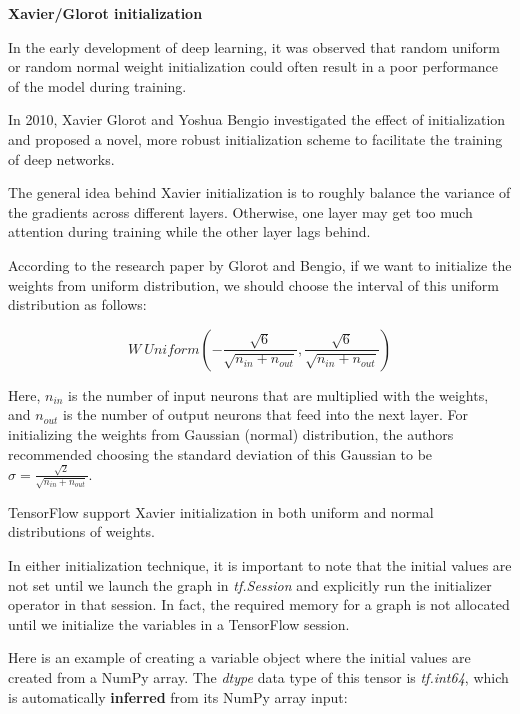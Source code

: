 \documentclass[11pt]{article}
\begin{document}
    \textbf{Xavier/Glorot initialization}

In the early development of deep learning, it was observed that random
uniform or random normal weight initialization could often result in a
poor performance of the model during training.

In 2010, Xavier Glorot and Yoshua Bengio investigated the effect of
initialization and proposed a novel, more robust initialization scheme
to facilitate the training of deep networks.

The general idea behind Xavier initialization is to roughly balance the
variance of the gradients across different layers. Otherwise, one layer
may get too much attention during training while the other layer lags
behind.

According to the research paper by Glorot and Bengio, if we want to
initialize the weights from uniform distribution, we should choose the
interval of this uniform distribution as follows:

\[W ~ Uniform \left(-\frac{\sqrt{6}}{\sqrt{n_{in} + n_{out}}}, \frac{\sqrt{6}}{\sqrt{n_{in} + n_{out}}} \right)\]

Here, \(n_{in}\) is the number of input neurons that are multiplied with
the weights, and \(n_{out}\) is the number of output neurons that feed
into the next layer. For initializing the weights from Gaussian (normal)
distribution, the authors recommended choosing the standard deviation of
this Gaussian to be
\(\sigma = \frac{\sqrt{2}}{\sqrt{n_{in} + n_{out}}}\).

TensorFlow support Xavier initialization in both uniform and normal
distributions of weights.

    In either initialization technique, it is important to note that the
initial values are not set until we launch the graph in
\emph{tf.Session} and explicitly run the initializer operator in that
session. In fact, the required memory for a graph is not allocated until
we initialize the variables in a TensorFlow session.

Here is an example of creating a variable object where the initial
values are created from a NumPy array. The \emph{dtype} data type of
this tensor is \emph{tf.int64}, which is automatically \textbf{inferred}
from its NumPy array input:
\end{document}
